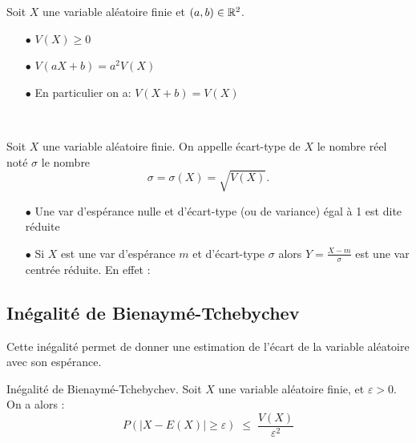 \documentclass[a4paper, 11pt]{article}
\begin{document}

 {  

\begin{prop} 
Soit $X$ une variable al\'eatoire finie et $(a,b)\in\mathbb{R}^2$. 
\begin{itemize}
\item[$\bullet$] $V(X) \geq 0$
\item[$\bullet$] $V(aX+b) = a^2 V(X)$
\item[$\bullet$] En particulier on a: $V(X+b)=V(X)$
\end{itemize}
\end{prop}
 
}




\

\begin{defi} 
Soit $X$ une variable al\'eatoire finie.
 On appelle \'ecart-type de $X$ le nombre r\'eel not\'e $\sigma$ le nombre 
 $$\sigma=\sigma(X) =\sqrt{V(X)}.$$


\end{defi}
 

\begin{exemple}
\begin{itemize}
\item[$\bullet$] Une var d'esp\'erance nulle et d'\'ecart-type (ou de variance) \'egal \`{a} 1 est dite réduite
\item[$\bullet$] Si $X$ est une var d'esp\'erance $m$ et d'\'ecart-type $\sigma$ alors $Y=\frac{X-m}{\sigma}$ est une var centr\'ee r\'eduite.
En effet :


\end{itemize}
\end{exemple}



\subsection{In\'egalit\'e de Bienaym\'e-Tchebychev}

 Cette in\'egalit\'e permet de donner une estimation de l'\'ecart de la variable al\'eatoire avec son esp\'erance.\vsec

 {  

\begin{prop} 
In\'egalit\'e de Bienaym\'e-Tchebychev. 
Soit $X$ une variable al\'eatoire finie, et $\varepsilon >0$. On a alors :
$$P(|X-E(X)| \geq \varepsilon) \; \leq \;  \frac{V(X)}{\varepsilon^2} $$
\end{prop}
 
}
\end{document}
